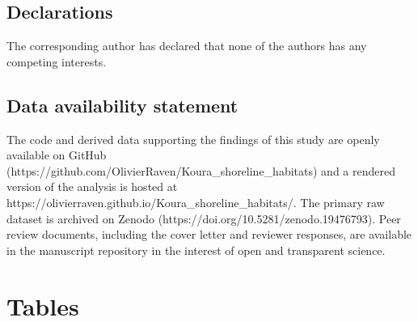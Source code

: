 \documentclass[
  letterpaper,
  DIV=11,
  numbers=noendperiod]{scrartcl}
\newcounter{none} %
\begin{document}
\subsection{Declarations}\label{declarations}

The corresponding author has declared that none of the authors has any
competing interests.

\subsection{Data availability
statement}\label{data-availability-statement}

The code and derived data supporting the findings of this study are
openly available on GitHub
(https://github.com/OlivierRaven/Koura\_shoreline\_habitats) and a
rendered version of the analysis is hosted at
https://olivierraven.github.io/Koura\_shoreline\_habitats/. The primary
raw dataset is archived on Zenodo
(https://doi.org/10.5281/zenodo.19476793). Peer review documents,
including the cover letter and reviewer responses, are available in the
manuscript repository in the interest of open and transparent science.

\section{Tables}\label{tables}
\end{document}
